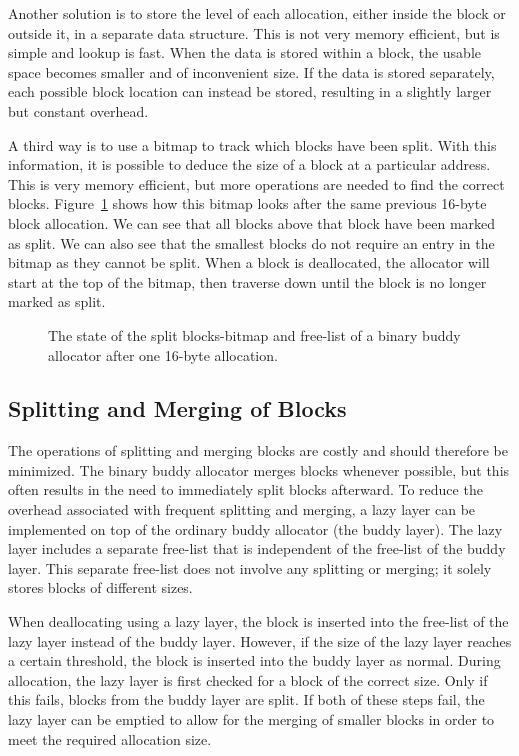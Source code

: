 Another solution is to store the level of each allocation, either inside the block or outside it, in a separate data structure. This is not very memory efficient, but is simple and lookup is fast. When the data is stored within a block, the usable space becomes smaller and of inconvenient size. If the data is stored separately, each possible block location can instead be stored, resulting in a slightly larger but constant overhead.

A third way is to use a bitmap to track which blocks have been split. With this information, it is possible to deduce the size of a block at a particular address. This is very memory efficient, but more operations are needed to find the correct blocks. Figure~\ref{fig:buddybmapsplit} shows how this bitmap looks after the same previous 16-byte block allocation. We can see that all blocks above that block have been marked as split. We can also see that the smallest blocks do not require an entry in the bitmap as they cannot be split. When a block is deallocated, the allocator will start at the top of the bitmap, then traverse down until the block is no longer marked as split.

\begin{figure}[H]
    \centering
    
    \caption{The state of the split blocks-bitmap and free-list of a binary buddy allocator after one 16-byte allocation.}
    \label{fig:buddybmapsplit}
\end{figure}

\subsection{Splitting and Merging of Blocks} \label{sec:lazyexpl}
The operations of splitting and merging blocks are costly and should therefore be minimized. The binary buddy allocator merges blocks whenever possible, but this often results in the need to immediately split blocks afterward. To reduce the overhead associated with frequent splitting and merging, a lazy layer can be implemented on top of the ordinary buddy allocator (the buddy layer). The lazy layer includes a separate free-list that is independent of the free-list of the buddy layer. This separate free-list does not involve any splitting or merging; it solely stores blocks of different sizes.

When deallocating using a lazy layer, the block is inserted into the free-list of the lazy layer instead of the buddy layer. However, if the size of the lazy layer reaches a certain threshold, the block is inserted into the buddy layer as normal. During allocation, the lazy layer is first checked for a block of the correct size. Only if this fails, blocks from the buddy layer are split. If both of these steps fail, the lazy layer can be emptied to allow for the merging of smaller blocks in order to meet the required allocation size.


